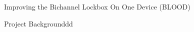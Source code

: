 \documentclass{project-proposal}
\begin{document}
\maintextfont

\makepageheader
{Improving the Bichannel Lockbox On One Device (BLOOD)} %

Project Backgrounddd
\end{document}
